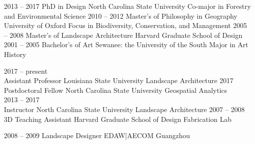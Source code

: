 \documentclass[10pt]{developercv} %
\begin{document}

\vspace*{-0.2cm}

\begin{entrylist}
	\entry
		{2013 -- 2017}
		{PhD in Design}
		{North Carolina State University}
		{Co-major in Forestry and Environmental Science}
	\entry
		{2010 -- 2012}
		{Master's of Philosophy in Geography} %
		{University of Oxford}
		{Focus in Biodiversity, Conservation, and Management}
	\entry
		{2005 -- 2008}
		{Master's of Landscape Architecture}
		{Harvard Graduate School of Design}
		{}
	\entry
		{2001 -- 2005}
		{Bachelor's of Art}
		{Sewanee: the University of the South}
		{Major in Art History}
\end{entrylist}


\vspace*{-0.3cm}

\begin{entrylist}
	\entry
		{2017 -- present\\}
		{Assistant Professor}
		{Louisiana State University}
		{Landscape Architecture}
	\entry
		{2017\\}
		{Postdoctoral Fellow}
		{North Carolina State University}
		{Geospatial Analytics\\
		}
	\entry
		{2013 -- 2017\\}
		{Instructor}
		{North Carolina State University}
		{Landscape Architecture}
	\entry
		{2007 -- 2008\\}
		{3D Teaching Assistant}
		{Harvard Graduate School of Design}
		{Fabrication Lab\\
		}
\end{entrylist}

\vspace*{-0.4cm}

\begin{entrylist}
	\entry
		{2008 -- 2009}
		{Landscape Designer}
		{EDAW|AECOM Guangzhou}
		{}
\end{entrylist}
\end{document}
